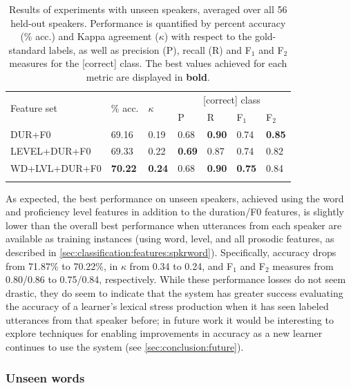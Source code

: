 	
	\begin{table}
			\centering
			\caption[Results of experiments with unseen speakers]{Results of experiments with unseen speakers, averaged over all 56 held-out speakers.
			Performance is quantified by percent accuracy (\% acc.) and Kappa agreement ($\kappa$) with respect to the gold-standard labels, as well as precision (P), recall (R) and F$_1$ and F$_2$ measures for the [correct] class. 
			 The best values achieved for each metric are displayed in \textbf{bold}.
			 }
			\begin{tabularx}{.8\textwidth}{lXXXXXX}		
			\toprule
			\multirow{2}{*}{Feature set} & \multirow{2}{*}{\% acc.} & \multirow{2}{*}{$\kappa$} & \multicolumn{4}{c}{[correct] class} \\
			\cmidrule(lr){4-7}
			& & & P & R & F$_1$ & F$_2$ \\
			\midrule
DUR+F0	&	69.16	&	0.19	&	0.68	&	\textbf{0.90}	&	0.74	&	\textbf{0.85}	\\
{LEVEL+DUR+F0}	&	69.33	&	0.22	&	\textbf{0.69}	&	0.87	&	0.74	&	0.82	\\
{WD+LVL+DUR+F0}	&	\textbf{70.22}	&	\textbf{0.24}	&	0.68	&	\textbf{0.90}	&	\textbf{0.75}	&	0.84	\\							
			\bottomrule
			\label{tab:results:speakers}
			\end{tabularx}
		\end{table}
		
		As expected, the best performance on unseen speakers, achieved using the word and proficiency level features in addition to the duration/F0 features, is slightly lower than the overall best performance when utterances from each speaker are available as training instances (using word, level, and all prosodic features, as described in \cref{sec:classification:features:spkrword}). Specifically, accuracy drops from 71.87\% to 70.22\%, in $\kappa$ from 0.34 to 0.24, and F$_1$ and F$_2$ measures from 0.80/0.86 to 0.75/0.84, respectively. While these performance losses do not seem drastic, they do seem to indicate that the system has greater success evaluating the accuracy of a learner's lexical stress production when it has seen  labeled utterances from that speaker before; in future work it would be interesting to explore techniques for enabling improvements in accuracy as a new learner continues to use the system (see \cref{sec:conclusion:future}).
		
		
		
		\subsubsection{Unseen words}
	
